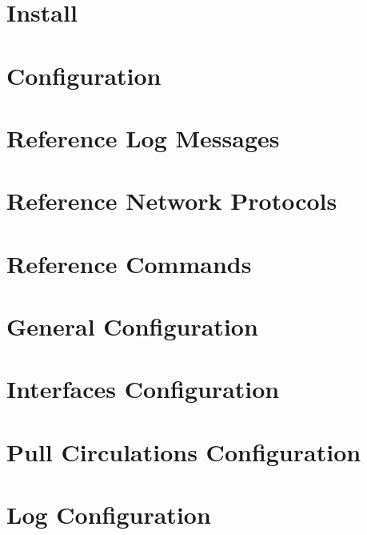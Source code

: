 \documentclass[
	oneside,
	openany,
	a4paper,
	headings=optiontoheadandtoc
	]{book}
\begin{document}
\chapter{Install}

 
\chapter{Configuration}


\chapter{Reference Log Messages}


\chapter{Reference Network Protocols}


\chapter{Reference Commands}


\appendix

\chapter{General Configuration}
 

\chapter{Interfaces Configuration}
 

\chapter{Pull Circulations Configuration}
 

\chapter{Log Configuration}

 
	
\end{document}
